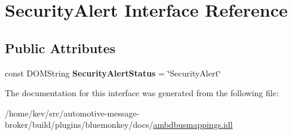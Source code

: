 \hypertarget{interfaceSecurityAlert}{\section{Security\+Alert Interface Reference}
\label{interfaceSecurityAlert}
}
\subsection*{Public Attributes}
\begin{DoxyCompactItemize}
\item 
\hypertarget{interfaceSecurityAlert_ab0779cd468893792f8a69126dc27013d}{const D\+O\+M\+String {\bfseries Security\+Alert\+Status} = \char`\"{}Security\+Alert\char`\"{}}\label{interfaceSecurityAlert_ab0779cd468893792f8a69126dc27013d}

\end{DoxyCompactItemize}


The documentation for this interface was generated from the following file\+:\begin{DoxyCompactItemize}
\item 
/home/kev/src/automotive-\/message-\/broker/build/plugins/bluemonkey/docs/\hyperlink{ambdbusmappings_8idl}{ambdbusmappings.\+idl}\end{DoxyCompactItemize}
